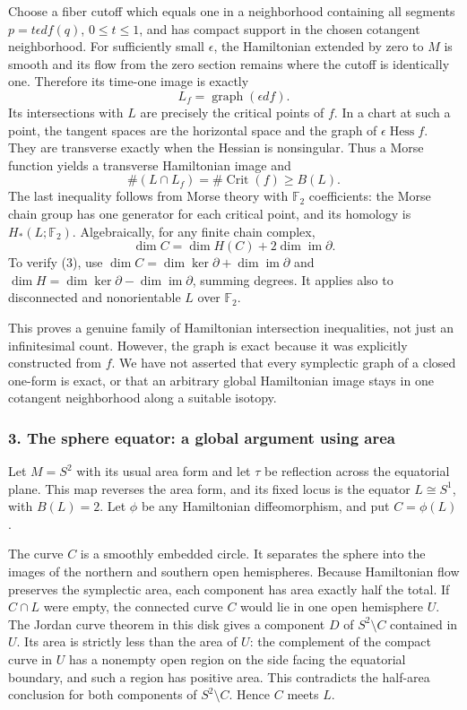 \documentclass[11pt]{article}
\begin{document}
Choose a fiber cutoff which equals one in a neighborhood containing all segments $p=t\epsilon df(q)$, $0\le t\le1$, and has compact support in the chosen cotangent neighborhood. For sufficiently small $\epsilon$, the Hamiltonian extended by zero to $M$ is smooth and its flow from the zero section remains where the cutoff is identically one. Therefore its time-one image is exactly
\[
 L_f=\operatorname{graph}(\epsilon df).
\]
Its intersections with $L$ are precisely the critical points of $f$. In a chart at such a point, the tangent spaces are the horizontal space and the graph of $\epsilon\operatorname{Hess}f$. They are transverse exactly when the Hessian is nonsingular. Thus a Morse function yields a transverse Hamiltonian image and
\[
 \#(L\cap L_f)=\#\operatorname{Crit}(f)\ge B(L).        \tag{2}
\]
The last inequality follows from Morse theory with $\mathbb F_2$ coefficients: the Morse chain group has one generator for each critical point, and its homology is $H_*(L;\mathbb F_2)$. Algebraically, for any finite chain complex,
\[
 \dim C=\dim H(C)+2\dim\operatorname{im}\partial.        \tag{3}
\]
To verify (3), use $\dim C=\dim\ker\partial+\dim\operatorname{im}\partial$ and $\dim H=\dim\ker\partial-\dim\operatorname{im}\partial$, summing degrees. It applies also to disconnected and nonorientable $L$ over $\mathbb F_2$.

This proves a genuine family of Hamiltonian intersection inequalities, not just an infinitesimal count. However, the graph is exact because it was explicitly constructed from $f$. We have not asserted that every symplectic graph of a closed one-form is exact, or that an arbitrary global Hamiltonian image stays in one cotangent neighborhood along a suitable isotopy.

\subsubsection{3. The sphere equator: a global argument using area}
Let $M=S^2$ with its usual area form and let $\tau$ be reflection across the equatorial plane. This map reverses the area form, and its fixed locus is the equator $L\cong S^1$, with $B(L)=2$. Let $\phi$ be any Hamiltonian diffeomorphism, and put $C=\phi(L)$.

The curve $C$ is a smoothly embedded circle. It separates the sphere into the images of the northern and southern open hemispheres. Because Hamiltonian flow preserves the symplectic area, each component has area exactly half the total. If $C\cap L$ were empty, the connected curve $C$ would lie in one open hemisphere $U$. The Jordan curve theorem in this disk gives a component $D$ of $S^2\setminus C$ contained in $U$. Its area is strictly less than the area of $U$: the complement of the compact curve in $U$ has a nonempty open region on the side facing the equatorial boundary, and such a region has positive area. This contradicts the half-area conclusion for both components of $S^2\setminus C$. Hence $C$ meets $L$.
\end{document}
